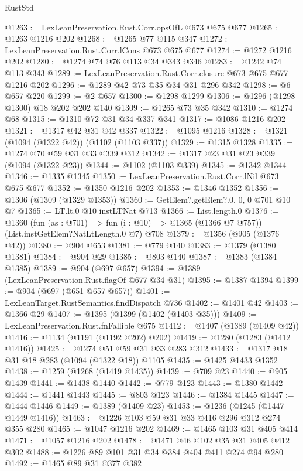 \begin{lexlean}{RustStd}
\begin{coremodule}
@1263 := LexLeanPreservation.Rust.Corr.opsOfL @673 @675 @677
@1265 := @1263 @1216 @202
@1268 := @1265 @77 @115 @347
@1272 := LexLeanPreservation.Rust.Corr.lCons @673 @675 @677
@1274 := @1272 @1216 @202
@1280 := @1274 @74 @76 @113 @34 @343 @346
@1283 := @1242 @74 @113 @343
@1289 := LexLeanPreservation.Rust.Corr.closure @673 @675 @677 @1216 @202
@1296 := @1289 @42 @73 @35 @34 @31 @296 @342
@1298 := @6 @657 @220
@1299 := @2 @657
@1300 := @1298 @1299
@1306 := @1296 (@1298 @1300) @18 @202 @202 @140
@1309 := @1265 @73 @35 @342
@1310 := @1274 @68
@1315 := @1310 @72 @31 @34 @337 @341
@1317 := @1086 @1216 @202
@1321 := @1317 @42 @31 @42 @337
@1322 := @1095 @1216
@1328 := @1321 (@1094 (@1322 @42)) (@1102 (@1103 @337))
@1329 := @1315 @1328
@1335 := @1274 @70 @59 @31 @33 @339 @312
@1342 := @1317 @23 @31 @23 @339 (@1094 (@1322 @23))
@1344 := @1102 (@1103 @339)
@1345 := @1342 @1344
@1346 := @1335 @1345
@1350 := LexLeanPreservation.Rust.Corr.lNil @673 @675 @677
@1352 := @1350 @1216 @202
@1353 := @1346 @1352
@1356 := @1306 (@1309 (@1329 @1353))
@1360 := GetElem?.getElem?.{0, 0, 0} @701 @10 @7
@1365 := LT.lt.{0} @10 instLTNat @713
@1366 := List.length.{0}
@1376 := @1360
    (fun (as : @701) => fun (i : @10) => @1365 (@1366 @7 @757))
    (List.instGetElem?NatLtLength.{0} @7)
    @708
@1379 := @1356 (@905 (@1376 @42))
@1380 := @904 @653
@1381 := @779 @140
@1383 := @1379 (@1380 @1381)
@1384 := @904 @29
@1385 := @803 @140
@1387 := @1383 (@1384 @1385)
@1389 := @904 (@697 @657)
@1394 := @1389 (LexLeanPreservation.Rust.flagOf @677 @34 @31)
@1395 := @1387 @1394
@1399 := @904 (@697 (@651 @657 @657))
@1401 := LexLeanTarget.RustSemantics.findDispatch @736
@1402 := @1401 @42
@1403 := @1366 @29
@1407 := @1395 (@1399 (@1402 (@1403 @35)))
@1409 := LexLeanPreservation.Rust.fnFallible @675
@1412 := @1407 (@1389 (@1409 @42))
@1416 := @1134 (@1191 (@1192 @202) @202)
@1419 := @1280 (@1283 (@1412 @1416))
@1425 := @1274 @51 @59 @31 @33 @283 @312
@1433 := @1317 @18 @31 @18 @283 (@1094 (@1322 @18)) @1105
@1435 := @1425 @1433 @1352
@1438 := @1259 (@1268 (@1419 @1435))
@1439 := @709 @23
@1440 := @905 @1439
@1441 := @1438 @1440
@1442 := @779 @123
@1443 := @1380 @1442
@1444 := @1441 @1443
@1445 := @803 @123
@1446 := @1384 @1445
@1447 := @1444 @1446
@1449 := @1389 (@1409 @23)
@1453 := @1236 (@1245 (@1447 @1449 @1416))
@1463 := @1226 @103 @59 @31 @33 @416 @296 @312 @274 @355 @280
@1465 := @1047 @1216 @202
@1469 := @1465 @103 @31 @405 @414
@1471 := @1057 @1216 @202
@1478 := @1471 @46 @102 @35 @31 @405 @412 @302
@1488 := @1226 @89 @101 @31 @34 @384 @404 @411 @274 @94 @280
@1492 := @1465 @89 @31 @377 @382

\end{coremodule}
\end{lexlean}
